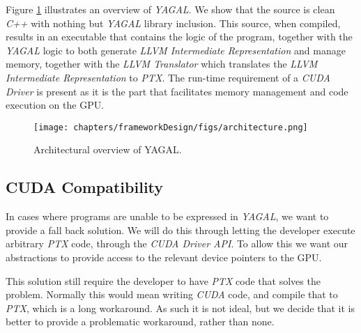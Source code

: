 Figure \ref{fig:architectureOverview} illustrates an overview of \textit{YAGAL}. We show that the source is clean \textit{C++} with nothing but \textit{YAGAL} library inclusion. This source, when compiled, results in an executable that contains the logic of the program, together with the \textit{YAGAL} logic to both generate \textit{LLVM Intermediate Representation} and manage memory, together with the \textit{LLVM Translator} which translates the \textit{LLVM Intermediate Representation} to \textit{PTX}. The run-time requirement of a \textit{CUDA Driver} is present as it is the part that facilitates memory management and code execution on the GPU.

\begin{figure}[H]
\center
\texttt{[image: chapters/frameworkDesign/figs/architecture.png]}
\caption{Architectural overview of YAGAL.}
\label{fig:architectureOverview}
\end{figure}


\subsection{CUDA Compatibility}
In cases where programs are unable to be expressed in \textit{YAGAL}, we want to provide a fall back solution. We will do this through letting the developer execute arbitrary \textit{PTX} code, through the \textit{CUDA Driver API}. To allow this we want our abstractions to provide access to the relevant device pointers to the GPU.

This solution still require the developer to have \textit{PTX} code that solves the problem. Normally this would mean writing \textit{CUDA} code, and compile that to \textit{PTX}, which is a long workaround. As such it is not ideal, but we decide that it is better to provide a problematic workaround, rather than none.